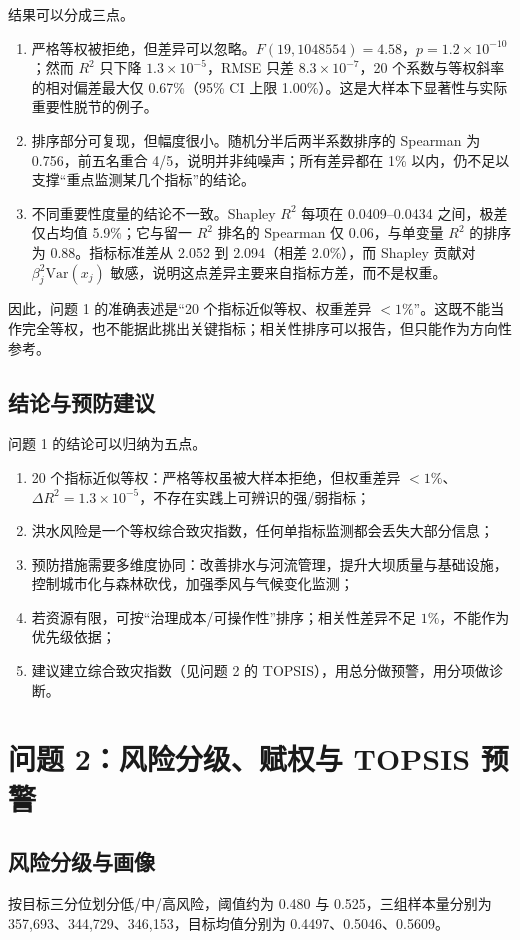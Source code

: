 \documentclass{article}
\begin{document}
结果可以分成三点。
\begin{enumerate}
  \item 严格等权被拒绝，但差异可以忽略。\(F(19,1048554)=4.58\)，\(p=1.2\times10^{-10}\)；然而 \(R^2\) 只下降 \(1.3\times10^{-5}\)，RMSE 只差 \(8.3\times10^{-7}\)，20 个系数与等权斜率的相对偏差最大仅 0.67\%（95\% CI 上限 1.00\%）。这是大样本下显著性与实际重要性脱节的例子。
  \item 排序部分可复现，但幅度很小。随机分半后两半系数排序的 Spearman 为 0.756，前五名重合 4/5，说明并非纯噪声；所有差异都在 1\% 以内，仍不足以支撑“重点监测某几个指标”的结论。
  \item 不同重要性度量的结论不一致。Shapley \(R^2\) 每项在 0.0409–0.0434 之间，极差仅占均值 5.9\%；它与留一 \(R^2\) 排名的 Spearman 仅 0.06，与单变量 \(R^2\) 的排序为 0.88。指标标准差从 2.052 到 2.094（相差 2.0\%），而 Shapley 贡献对 \(\beta_j^2\mathrm{Var}(x_j)\) 敏感，说明这点差异主要来自指标方差，而不是权重。
\end{enumerate}

因此，问题 1 的准确表述是“20 个指标近似等权、权重差异 $<1\%$”。这既不能当作完全等权，也不能据此挑出关键指标；相关性排序可以报告，但只能作为方向性参考。

\subsection{结论与预防建议}
问题 1 的结论可以归纳为五点。
\begin{enumerate}
  \item 20 个指标近似等权：严格等权虽被大样本拒绝，但权重差异 $<1\%$、$\Delta R^2=1.3\times10^{-5}$，不存在实践上可辨识的强/弱指标；
  \item 洪水风险是一个等权综合致灾指数，任何单指标监测都会丢失大部分信息；
  \item 预防措施需要多维度协同：改善排水与河流管理，提升大坝质量与基础设施，控制城市化与森林砍伐，加强季风与气候变化监测；
  \item 若资源有限，可按“治理成本/可操作性”排序；相关性差异不足 $1\%$，不能作为优先级依据；
  \item 建议建立综合致灾指数（见问题 2 的 TOPSIS），用总分做预警，用分项做诊断。
\end{enumerate}

\section{问题 2：风险分级、赋权与 TOPSIS 预警}

\subsection{风险分级与画像}
按目标三分位划分低/中/高风险，阈值约为 0.480 与 0.525，三组样本量分别为 357,693、344,729、346,153，目标均值分别为 0.4497、0.5046、0.5609。
\end{document}
